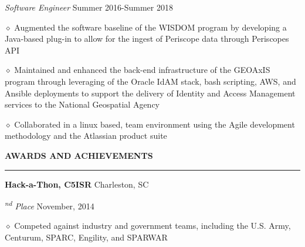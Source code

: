 \documentclass[executivepaper]{extarticle}
\begin{document}
\begin{center}
{\begin{minipage}{7.0in}
{\noindent \textit{\fontsize{12}{8}\selectfont Software Engineer}} {\hfill \fontsize{10}{8}\selectfont Summer 2016-Summer 2018}

\vspace{1mm}

{\noindent $\diamond$ {\fontsize{12}{8}\selectfont Augmented the software baseline of the WISDOM program by developing a Java-based plug-in to allow for the ingest of Periscope data through Periscope\textsc{}s API}}

\vspace{1mm}

{\noindent $\diamond$ {\fontsize{12}{8}\selectfont Maintained and enhanced the back-end infrastructure of the GEOAxIS program through leveraging of the Oracle IdAM stack, bash scripting, AWS, and Ansible deployments to support the delivery of Identity and Access Management services to the National Geospatial Agency}}

\vspace{1mm}

{\noindent $\diamond$ {\fontsize{12}{8}\selectfont Collaborated in a linux based, team environment using the Agile development methodology and the Atlassian product suite}}

\vspace{3mm}


{\noindent \textbf{\fontsize{12}{9}\selectfont AWARDS AND ACHIEVEMENTS}}

\vspace{-3mm}

\noindent \rule{\textwidth}{0.5pt}

\vspace{1mm}

{\noindent \textbf{\fontsize{12}{8}\selectfont Hack-a-Thon, C5ISR}} {\hfill \fontsize{10}{8}\selectfont Charleston, SC}

{\noindent \textit{\fontsize{12}{8}\textsuperscript{nd} Place}} {\hfill \fontsize{10}{8}\selectfont November, 2014}

\vspace{1mm}

{\noindent $\diamond$ {\fontsize{12}{8}\selectfont Competed against industry and government teams, including the U.S. Army, Centurum, SPARC, Engility, and SPARWAR}}

\vspace{2mm}


\end{minipage}}
\end{center}
\end{document}
